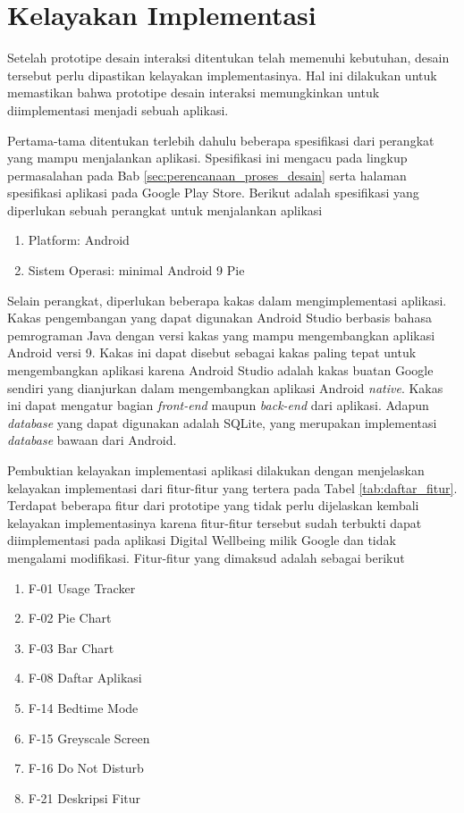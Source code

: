 \section{Kelayakan Implementasi}
\label{sec:kelayakan}

Setelah prototipe desain interaksi ditentukan telah memenuhi kebutuhan, desain tersebut perlu dipastikan kelayakan implementasinya. Hal ini dilakukan untuk memastikan bahwa prototipe desain interaksi memungkinkan untuk diimplementasi menjadi sebuah aplikasi.

Pertama-tama ditentukan terlebih dahulu beberapa spesifikasi dari perangkat yang mampu menjalankan aplikasi. Spesifikasi ini mengacu pada lingkup permasalahan pada Bab \ref{sec:perencanaan_proses_desain} serta halaman spesifikasi aplikasi pada Google Play Store. Berikut adalah spesifikasi yang diperlukan sebuah perangkat untuk menjalankan aplikasi

\begin{enumerate}
  \item Platform: Android
  \item Sistem Operasi: minimal Android 9 Pie
\end{enumerate}

Selain perangkat, diperlukan beberapa kakas dalam mengimplementasi aplikasi. Kakas pengembangan yang dapat digunakan Android Studio berbasis bahasa pemrograman Java dengan versi kakas yang mampu mengembangkan aplikasi Android versi 9. Kakas ini dapat disebut sebagai kakas paling tepat untuk mengembangkan aplikasi karena Android Studio adalah kakas buatan Google sendiri yang dianjurkan dalam mengembangkan aplikasi Android \textit{native}. Kakas ini dapat mengatur bagian \textit{front-end} maupun \textit{back-end} dari aplikasi. Adapun \textit{database} yang dapat digunakan adalah SQLite, yang merupakan implementasi \textit{database} bawaan dari Android.

Pembuktian kelayakan implementasi aplikasi dilakukan dengan menjelaskan kelayakan implementasi dari fitur-fitur yang tertera pada Tabel \ref{tab:daftar_fitur}. Terdapat beberapa fitur dari prototipe yang tidak perlu dijelaskan kembali kelayakan implementasinya karena fitur-fitur tersebut sudah terbukti dapat diimplementasi pada aplikasi Digital Wellbeing milik Google dan tidak mengalami modifikasi. Fitur-fitur yang dimaksud adalah sebagai berikut

\begin{enumerate}
  \item F-01 Usage Tracker
  \item F-02 Pie Chart
  \item F-03 Bar Chart
  \item F-08 Daftar Aplikasi
  \item F-14 Bedtime Mode
  \item F-15 Greyscale Screen
  \item F-16 Do Not Disturb
  \item F-21 Deskripsi Fitur
\end{enumerate}

